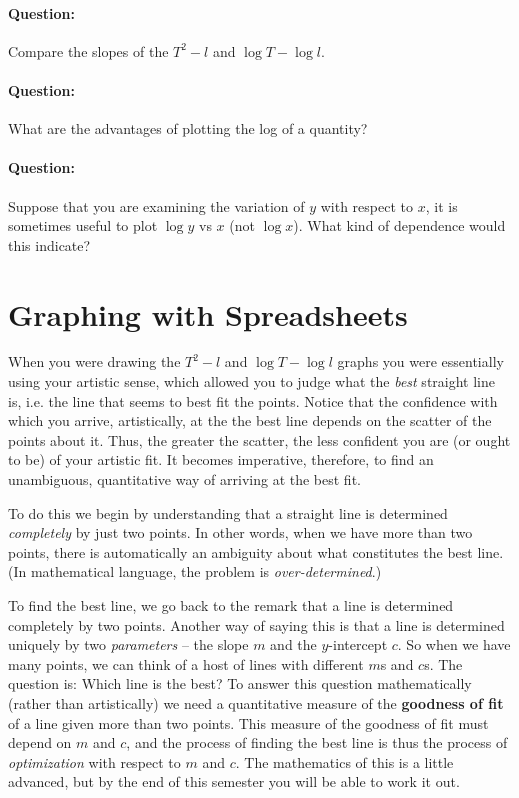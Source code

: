 \begin{question}
\paragraph{Question:} Compare the slopes of the $T^2 - l$ and $\log T - \log l$. ~\\

\paragraph{Question:} What are the advantages of plotting the log of a quantity?~\\

\paragraph{Question:} Suppose that you are examining the variation of $y$ with respect to $x$, it is sometimes useful to plot $\log y$ vs $x$ (not $\log x$). What kind of dependence would this indicate?

\end{question}

\section{Graphing with Spreadsheets}

When you were drawing the $T^2 - l$ and $\log T - \log l$ graphs you were essentially using your artistic sense, which allowed you to judge what the \textit{best} straight line is, i.e. the line that seems to best fit the points. Notice that the confidence with which you arrive, artistically, at the the best line depends on the scatter of the points about it. Thus, the greater the scatter, the less confident you are (or ought to be) of your artistic fit. It becomes imperative, therefore, to find an unambiguous, quantitative way of arriving at the best fit. 

To do this we begin by understanding that a straight line is determined \textit{completely} by just two points. In other words, when we have more than two points, there is automatically an ambiguity about what constitutes the best line. (In mathematical language, the problem is \textit{over-determined}.) 

To find the best line, we go back to the remark that a line is determined completely by two points. Another way of saying this is that a line is determined uniquely by two \textit{parameters} -- the slope $m$ and the $y$-intercept $c$. So when we have many points, we can think of a host of lines with different $m$s and $c$s. The question is: Which line is the best? To answer this question mathematically (rather than artistically) we need a quantitative measure of the \textbf{goodness of fit} of a line given more than two points. This measure of the goodness of fit must depend on $m$ and $c$, and the process of finding the best line is thus the process of \textit{optimization} with respect to $m$ and $c$. The mathematics of this is a little advanced, but by the end of this semester you will be able to work it out. 

